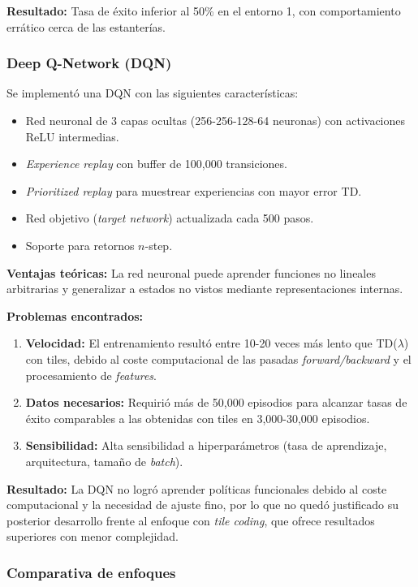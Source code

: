 \documentclass[a4paper,12pt]{article}
\begin{document}
\textbf{Resultado:} Tasa de éxito inferior al 50\% en el entorno 1, con comportamiento errático cerca de las estanterías.

\subsubsection{Deep Q-Network (DQN)}

Se implementó una DQN con las siguientes características:
\begin{itemize}
    \item Red neuronal de 3 capas ocultas (256-256-128-64 neuronas) con activaciones ReLU intermedias.
    \item \textit{Experience replay} con buffer de 100,000 transiciones.
    \item \textit{Prioritized replay} para muestrear experiencias con mayor error TD.
    \item Red objetivo (\textit{target network}) actualizada cada 500 pasos.
    \item Soporte para retornos $n$-step.
\end{itemize}

\textbf{Ventajas teóricas:} La red neuronal puede aprender funciones no lineales arbitrarias y generalizar a estados no vistos mediante representaciones internas.

\textbf{Problemas encontrados:}
\begin{enumerate}
    \item \textbf{Velocidad:} El entrenamiento resultó entre 10-20 veces más lento que TD($\lambda$) con tiles, debido al coste computacional de las pasadas \textit{forward/backward} y el procesamiento de \textit{features}.
    \item \textbf{Datos necesarios:} Requirió más de 50,000 episodios para alcanzar tasas de éxito comparables a las obtenidas con tiles en 3,000-30,000 episodios.
    \item \textbf{Sensibilidad:} Alta sensibilidad a hiperparámetros (tasa de aprendizaje, arquitectura, tamaño de \textit{batch}).
\end{enumerate}

\textbf{Resultado:} La DQN no logró aprender políticas funcionales debido al coste computacional y la necesidad de ajuste fino, por lo que no quedó justificado su posterior desarrollo frente al enfoque con \textit{tile coding}, que ofrece resultados superiores con menor complejidad.

\subsubsection{Comparativa de enfoques}
\end{document}

